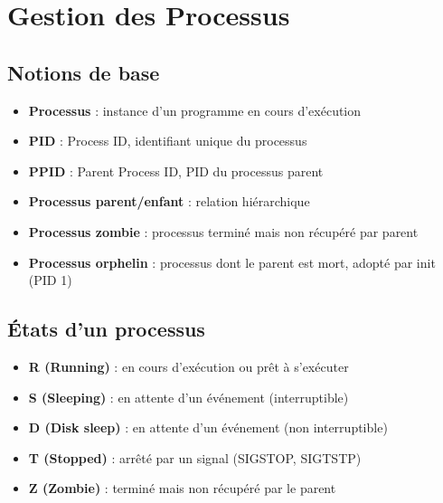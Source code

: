 \documentclass[12pt,a4paper]{article}
\begin{document}
\section{Gestion des Processus}


\subsection{Notions de base}
\begin{itemize}
    \item \textbf{Processus} : instance d'un programme en cours d'ex\'ecution %
    \item \textbf{PID} : Process ID, identifiant unique du processus %
    \item \textbf{PPID} : Parent Process ID, PID du processus parent %
    \item \textbf{Processus parent/enfant} : relation hi\'erarchique %
    \item \textbf{Processus zombie} : processus termin\'e mais non r\'ecup\'er\'e par parent %
    \item \textbf{Processus orphelin} : processus dont le parent est mort, adopt\'e par init (PID 1) %
\end{itemize}


\subsection{\'Etats d'un processus}
\begin{itemize}
    \item \textbf{R (Running)} : en cours d'ex\'ecution ou pr\^et \`a s'ex\'ecuter %
    \item \textbf{S (Sleeping)} : en attente d'un \'ev\'enement (interruptible) %
    \item \textbf{D (Disk sleep)} : en attente d'un \'ev\'enement (non interruptible) %
    \item \textbf{T (Stopped)} : arr\^et\'e par un signal (SIGSTOP, SIGTSTP) %
    \item \textbf{Z (Zombie)} : termin\'e mais non r\'ecup\'er\'e par le parent %
\end{itemize}
\end{document}
